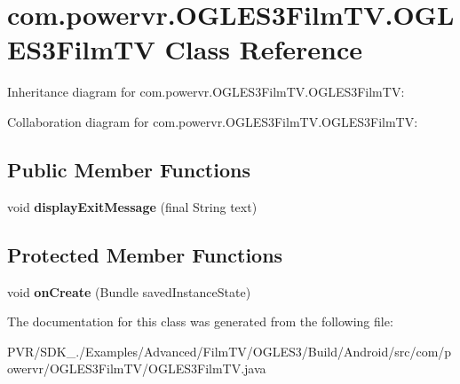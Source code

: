 \hypertarget{classcom_1_1powervr_1_1_o_g_l_e_s3_film_t_v_1_1_o_g_l_e_s3_film_t_v}{\section{com.\+powervr.\+O\+G\+L\+E\+S3\+Film\+T\+V.\+O\+G\+L\+E\+S3\+Film\+T\+V Class Reference}
\label{classcom_1_1powervr_1_1_o_g_l_e_s3_film_t_v_1_1_o_g_l_e_s3_film_t_v}
}


Inheritance diagram for com.\+powervr.\+O\+G\+L\+E\+S3\+Film\+T\+V.\+O\+G\+L\+E\+S3\+Film\+T\+V\+:


Collaboration diagram for com.\+powervr.\+O\+G\+L\+E\+S3\+Film\+T\+V.\+O\+G\+L\+E\+S3\+Film\+T\+V\+:
\subsection*{Public Member Functions}
\begin{DoxyCompactItemize}
\item 
\hypertarget{classcom_1_1powervr_1_1_o_g_l_e_s3_film_t_v_1_1_o_g_l_e_s3_film_t_v_ab0c22e153d92058a2619f29d6c3bfe36}{void {\bfseries display\+Exit\+Message} (final String text)}\label{classcom_1_1powervr_1_1_o_g_l_e_s3_film_t_v_1_1_o_g_l_e_s3_film_t_v_ab0c22e153d92058a2619f29d6c3bfe36}

\end{DoxyCompactItemize}
\subsection*{Protected Member Functions}
\begin{DoxyCompactItemize}
\item 
\hypertarget{classcom_1_1powervr_1_1_o_g_l_e_s3_film_t_v_1_1_o_g_l_e_s3_film_t_v_aed9eb2336015a6a12ee0474f2d241837}{void {\bfseries on\+Create} (Bundle saved\+Instance\+State)}\label{classcom_1_1powervr_1_1_o_g_l_e_s3_film_t_v_1_1_o_g_l_e_s3_film_t_v_aed9eb2336015a6a12ee0474f2d241837}

\end{DoxyCompactItemize}


The documentation for this class was generated from the following file\+:\begin{DoxyCompactItemize}
\item 
P\+V\+R/\+S\+D\+K\+\_./\+Examples/\+Advanced/\+Film\+T\+V/\+O\+G\+L\+E\+S3/\+Build/\+Android/src/com/powervr/\+O\+G\+L\+E\+S3\+Film\+T\+V/O\+G\+L\+E\+S3\+Film\+T\+V.\+java\end{DoxyCompactItemize}
